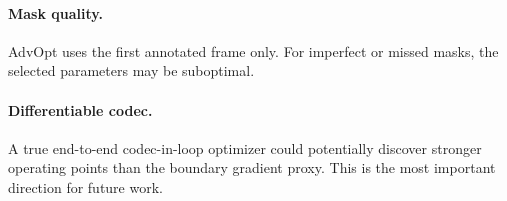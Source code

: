 \paragraph{Mask quality.} AdvOpt uses the first annotated frame only. For imperfect or missed masks, the selected parameters may be suboptimal.

\paragraph{Differentiable codec.} A true end-to-end codec-in-loop optimizer could potentially discover stronger operating points than the boundary gradient proxy. This is the most important direction for future work.
